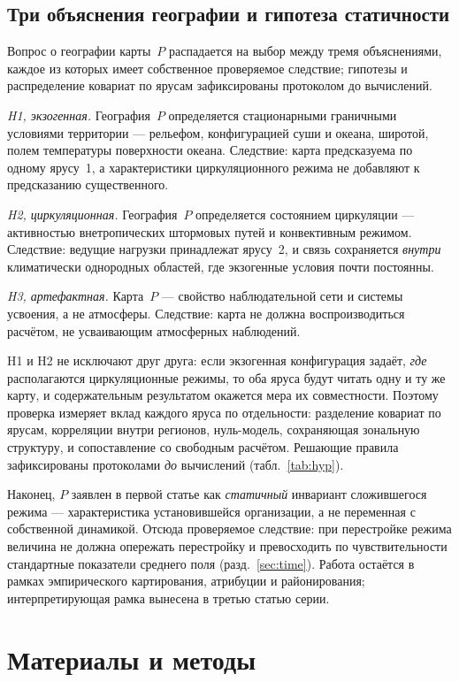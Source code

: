 \documentclass[11pt,a4paper]{article}
\begin{document}
\subsection{Три объяснения географии и гипотеза статичности}
\label{sec:hypotheses}

Вопрос о географии карты~$P$ распадается на выбор между тремя объяснениями, каждое из которых имеет собственное проверяемое следствие; гипотезы и распределение ковариат по ярусам зафиксированы протоколом до вычислений.

\emph{H1, экзогенная.} География~$P$ определяется стационарными граничными условиями территории --- рельефом, конфигурацией суши и океана, широтой, полем температуры поверхности океана. Следствие: карта предсказуема по одному ярусу~1, а характеристики циркуляционного режима не добавляют к предсказанию существенного.

\emph{H2, циркуляционная.} География~$P$ определяется состоянием циркуляции --- активностью внетропических штормовых путей и конвективным режимом. Следствие: ведущие нагрузки принадлежат ярусу~2, и связь сохраняется \emph{внутри} климатически однородных областей, где экзогенные условия почти постоянны.

\emph{H3, артефактная.} Карта~$P$ --- свойство наблюдательной сети и системы усвоения, а не атмосферы. Следствие: карта не должна воспроизводиться расчётом, не усваивающим атмосферных наблюдений.

H1 и H2 не исключают друг друга: если экзогенная конфигурация задаёт, \emph{где} располагаются циркуляционные режимы, то оба яруса будут читать одну и ту же карту, и содержательным результатом окажется мера их совместности. Поэтому проверка измеряет вклад каждого яруса по отдельности: разделение ковариат по ярусам, корреляции внутри регионов, нуль-модель, сохраняющая зональную структуру, и сопоставление со свободным расчётом. Решающие правила зафиксированы протоколами \emph{до} вычислений (табл.~\ref{tab:hyp}).

Наконец, $P$ заявлен в первой статье как \emph{статичный} инвариант сложившегося режима --- характеристика установившейся организации, а не переменная с собственной динамикой. Отсюда проверяемое следствие: при перестройке режима величина не должна опережать перестройку и превосходить по чувствительности стандартные показатели среднего поля (разд.~\ref{sec:time}). Работа остаётся в рамках эмпирического картирования, атрибуции и районирования; интерпретирующая рамка вынесена в третью статью серии.

\section{Материалы и методы}
\label{sec:data}
\end{document}
